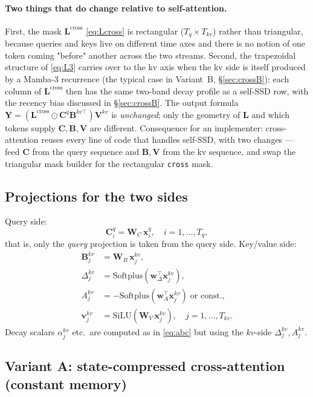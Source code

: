 \documentclass[11pt,a4paper]{article}
\begin{document}
\paragraph{Two things that do change relative to self-attention.}
First, the mask $\bm{L}^{\text{cross}}$ \eqref{eq:Lcross} is
rectangular ($T_q \times T_{kv}$) rather than triangular, because
queries and keys live on different time axes and there is no notion
of one token coming "before" another across the two streams.
Second, the trapezoidal structure of \eqref{eq:L3} carries over to
the kv axis when the kv side is itself produced by a Mamba-3
recurrence (the typical case in Variant~B, \S\ref{sec:crossB}): each
column of $\bm{L}^{\text{cross}}$ then has the same two-band decay
profile as a self-SSD row, with the recency bias discussed in
\S\ref{sec:crossB}. The output formula $\bm{Y} =
(\bm{L}^{\text{cross}}\odot\bm{C}^q\bm{B}^{kv\top})\bm{V}^{kv}$ is
\emph{unchanged}; only the geometry of $\bm{L}$ and which tokens
supply $\bm{C}, \bm{B}, \bm{V}$ are different. Consequence for an
implementer: cross-attention reuses every line of code that handles
self-SSD, with two changes — feed $\bm{C}$ from the query sequence
and $\bm{B}, \bm{V}$ from the kv sequence, and swap the
triangular mask builder for the rectangular \texttt{cross} mask.

\subsection{Projections for the two sides}

Query side:
\begin{equation}\label{eq:cross-proj-q}
  \bm{C}_i^{q} = \bm{W}_C\,\bm{x}_i^{q},
  \quad i=1,\dots,T_q,
\end{equation}
that is, only the \emph{query} projection is taken from the query
side. Key/value side:
\begin{align}
  \bm{B}_j^{kv} &= \bm{W}_B\,\bm{x}_j^{kv}, \\
  \Delta_j^{kv} &= \mathrm{Softplus}(\bm{w}_\Delta^\top \bm{x}_j^{kv}), \\
  A_j^{kv}      &= -\mathrm{Softplus}(\bm{w}_A^\top \bm{x}_j^{kv})\;\text{or const.}, \\
  \bm{v}_j^{kv} &= \mathrm{SiLU}(\bm{W}_V\,\bm{x}_j^{kv}),
  \quad j=1,\dots,T_{kv}.
\end{align}
Decay scalars $\alpha_j^{kv}$ etc.\ are computed as in \eqref{eq:abc}
but using the $kv$-side $\Delta_j^{kv}, A_j^{kv}$.

\subsection{Variant A: state-compressed cross-attention (constant memory)}
\label{sec:crossA}
\end{document}
